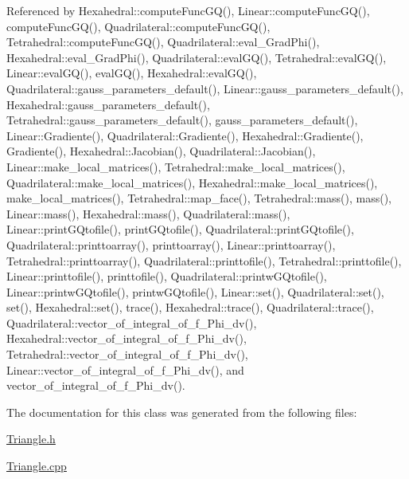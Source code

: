 Referenced by Hexahedral\+::compute\+Func\+G\+Q(), Linear\+::compute\+Func\+G\+Q(), compute\+Func\+G\+Q(), Quadrilateral\+::compute\+Func\+G\+Q(), Tetrahedral\+::compute\+Func\+G\+Q(), Quadrilateral\+::eval\+\_\+\+Grad\+Phi(), Hexahedral\+::eval\+\_\+\+Grad\+Phi(), Quadrilateral\+::eval\+G\+Q(), Tetrahedral\+::eval\+G\+Q(), Linear\+::eval\+G\+Q(), eval\+G\+Q(), Hexahedral\+::eval\+G\+Q(), Quadrilateral\+::gauss\+\_\+parameters\+\_\+default(), Linear\+::gauss\+\_\+parameters\+\_\+default(), Hexahedral\+::gauss\+\_\+parameters\+\_\+default(), Tetrahedral\+::gauss\+\_\+parameters\+\_\+default(), gauss\+\_\+parameters\+\_\+default(), Linear\+::\+Gradiente(), Quadrilateral\+::\+Gradiente(), Hexahedral\+::\+Gradiente(), Gradiente(), Hexahedral\+::\+Jacobian(), Quadrilateral\+::\+Jacobian(), Linear\+::make\+\_\+local\+\_\+matrices(), Tetrahedral\+::make\+\_\+local\+\_\+matrices(), Quadrilateral\+::make\+\_\+local\+\_\+matrices(), Hexahedral\+::make\+\_\+local\+\_\+matrices(), make\+\_\+local\+\_\+matrices(), Tetrahedral\+::map\+\_\+face(), Tetrahedral\+::mass(), mass(), Linear\+::mass(), Hexahedral\+::mass(), Quadrilateral\+::mass(), Linear\+::print\+G\+Qtofile(), print\+G\+Qtofile(), Quadrilateral\+::print\+G\+Qtofile(), Quadrilateral\+::printtoarray(), printtoarray(), Linear\+::printtoarray(), Tetrahedral\+::printtoarray(), Quadrilateral\+::printtofile(), Tetrahedral\+::printtofile(), Linear\+::printtofile(), printtofile(), Quadrilateral\+::printw\+G\+Qtofile(), Linear\+::printw\+G\+Qtofile(), printw\+G\+Qtofile(), Linear\+::set(), Quadrilateral\+::set(), set(), Hexahedral\+::set(), trace(), Hexahedral\+::trace(), Quadrilateral\+::trace(), Quadrilateral\+::vector\+\_\+of\+\_\+integral\+\_\+of\+\_\+f\+\_\+\+Phi\+\_\+dv(), Hexahedral\+::vector\+\_\+of\+\_\+integral\+\_\+of\+\_\+f\+\_\+\+Phi\+\_\+dv(), Tetrahedral\+::vector\+\_\+of\+\_\+integral\+\_\+of\+\_\+f\+\_\+\+Phi\+\_\+dv(), Linear\+::vector\+\_\+of\+\_\+integral\+\_\+of\+\_\+f\+\_\+\+Phi\+\_\+dv(), and vector\+\_\+of\+\_\+integral\+\_\+of\+\_\+f\+\_\+\+Phi\+\_\+dv().



The documentation for this class was generated from the following files\+:\begin{DoxyCompactItemize}
\item 
\hyperlink{Triangle_8h}{Triangle.\+h}\item 
\hyperlink{Triangle_8cpp}{Triangle.\+cpp}\end{DoxyCompactItemize}
